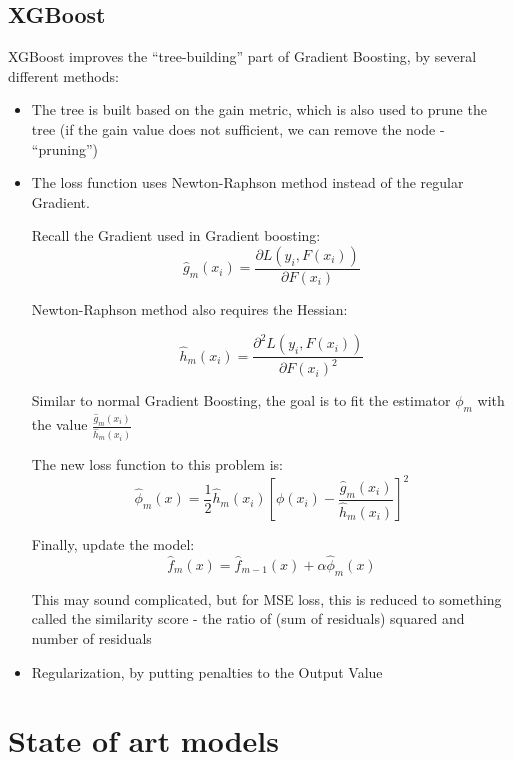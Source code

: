 \documentclass[a4paper, 12pt]{article}
\begin{document}
\subsection{XGBoost}
XGBoost improves the “tree-building” part of Gradient Boosting, by several different methods:
\begin{itemize}
    \item The tree is built based on the gain metric, which is also used to prune the tree (if the gain value does not sufficient, we can remove the node - “pruning”)
    \item The loss function uses Newton-Raphson method instead of the regular Gradient.

    Recall the Gradient used in Gradient boosting:
    \begin{equation}
        \hat{g}_m(x_i) = \frac{\partial L(y_i,F(x_i))}{\partial F(x_i)}
    \end{equation}

    Newton-Raphson method also requires the Hessian:

    \begin{equation}
        \hat{h}_m(x_i) = \frac{\partial^2 L(y_i,F(x_i))}{\partial F(x_i)^2}
    \end{equation}

    Similar to normal Gradient Boosting, the goal is to fit the estimator $\phi_m$ with the value $\frac{\hat{g}_m(x_i)}{\hat{h}_m(x_i)}$

    The new loss function to this problem is:
    \begin{equation}
        \hat{\phi}_m (x) = \frac{1}{2}\hat{h}_m(x_i)\left[\phi(x_i) - \frac{\hat{g}_m(x_i)}{\hat{h}_m(x_i)}\right]^2
    \end{equation}

    Finally, update the model:
    \begin{equation}
        \hat{f}_m(x) = \hat{f}_{m-1}(x) + \alpha \hat{\phi}_m (x) 
    \end{equation}
    
    This may sound complicated, but for MSE loss, this is reduced to something called the similarity score - the ratio of (sum of residuals) squared and number of residuals
    \item Regularization, by putting penalties to the Output Value
\end{itemize}
\section{State of art models}
\end{document}
